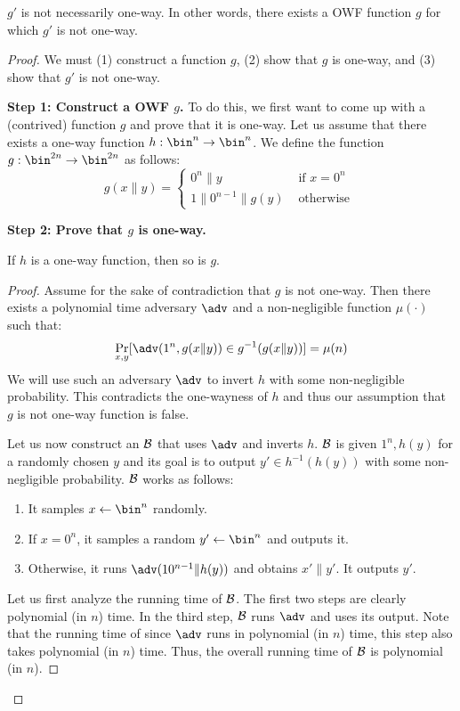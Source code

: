\documentclass[12pt]{tufte-book}
\begin{document}
\begin{claim}
$g'$ is not necessarily one-way. In other words, there exists a OWF function $g$ for which $g'$ is not one-way.
\end{claim}
\begin{proof}
We must (1) construct a function $g$, (2) show that $g$ is one-way, and (3) show that $g'$ is not one-way.


\noindent\textbf{Step 1: Construct a OWF $g$.} 
To do this, we first want to come up with a (contrived) function $g$ and prove that it is one-way.
Let us assume that there exists a one-way function $h : \bin^n \rightarrow \bin^n$. We define the function $g : \bin^{2n} \rightarrow \bin^{2n}$ as follows:
$$
g(x\|y) = \begin{cases}
 0^{n}\|y &\text{    if } x = 0^n\\
1\|0^{n-1}\|g(y) &\text{    otherwise }
\end{cases}
$$

\noindent\textbf{Step 2: Prove that $g$ is one-way.}

\begin{claim}
If $h$ is a one-way function, then so is $g$.
\end{claim}
\begin{proof}
Assume for the sake of contradiction that $g$ is not one-way. Then there exists a polynomial time adversary $\adv$ and a non-negligible function $\mu(\cdot)$ such that:
$$
\Pr_{x,y}[\adv(1^n,g(x\|y)) \in g^{-1}(g(x\|y))] = \mu(n)
$$
We will use such an adversary $\adv$ to invert $h$ with some non-negligible probability. This contradicts the one-wayness of $h$ and thus our assumption that $g$ is not one-way function is false.

Let us now construct an $\mathcal{B}$ that uses $\adv$ and inverts $h$. $\mathcal{B}$ is given $1^n,h(y)$ for a randomly chosen $y$ and its goal is to output $y' \in h^{-1}(h(y))$ with some non-negligible probability. $\mathcal{B}$ works as follows:
\begin{enumerate}
\item It samples $x \gets \bin^n$ randomly.
\item If $x = 0^n$, it samples a random $y' \gets \bin^n$ and outputs it.
\item Otherwise, it runs $\adv(10^{n-1}\|h(y))$ and obtains $x' \| y'$. It outputs $y'$.
\end{enumerate}

Let us first analyze the running time of $\mathcal{B}$. The first two steps are clearly polynomial (in $n$) time. In the third step, $\mathcal{B}$ runs $\adv$ and uses its output. Note that the running time of since $\adv$ runs in polynomial (in $n$) time, this step also takes polynomial (in $n$) time. Thus, the overall running time of $\mathcal{B}$ is polynomial (in $n$).


\end{proof}
\end{proof}
\end{document}
